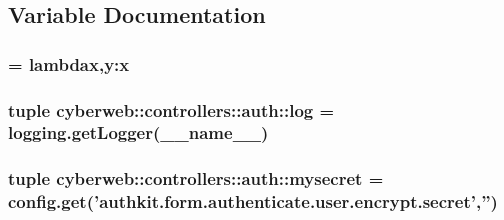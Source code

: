 \subsection{\-Variable \-Documentation}
\hypertarget{namespacecyberweb_1_1controllers_1_1auth_a17be375ca6587d3c9195e80006734b9c}{
\subsubsection[{encrypt}]{ = lambdax,y\-:x}}\label{namespacecyberweb_1_1controllers_1_1auth_a17be375ca6587d3c9195e80006734b9c}
\hypertarget{namespacecyberweb_1_1controllers_1_1auth_a5e673f4bbac4247a6f26e55e4ec6f6bb}{
\subsubsection[{log}]{\setlength{\rightskip}{0pt plus 5cm}tuple {\bf cyberweb\-::controllers\-::auth\-::log} = logging.\-get\-Logger(\-\_\-\-\_\-name\-\_\-\-\_\-)}}\label{namespacecyberweb_1_1controllers_1_1auth_a5e673f4bbac4247a6f26e55e4ec6f6bb}
\hypertarget{namespacecyberweb_1_1controllers_1_1auth_a4c2aa2111195c06f775e3d17dd48c13d}{
\subsubsection[{mysecret}]{\setlength{\rightskip}{0pt plus 5cm}tuple {\bf cyberweb\-::controllers\-::auth\-::mysecret} = config.\-get('authkit.\-form.\-authenticate.\-user.\-encrypt.\-secret','')}}\label{namespacecyberweb_1_1controllers_1_1auth_a4c2aa2111195c06f775e3d17dd48c13d}
